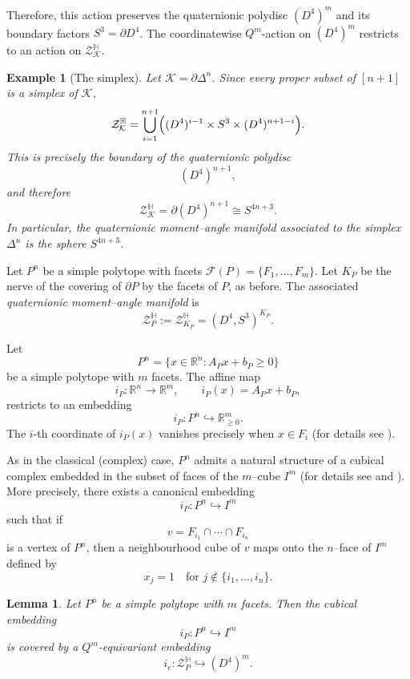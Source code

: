 \documentclass[11pt,a4paper]{article}
\numberwithin{equation}{section}
\newtheorem{example}[definition]{Example}
\newtheorem{lemma}[definition]{Lemma}
\theoremstyle{named}
\begin{document}
Therefore, this action preserves the quaternionic polydisc \((D^4)^m\) and its boundary factors \(S^3=\partial D^4\). The coordinatewise \(Q^m\)-action on \((D^4)^m\) restricts to an action on \(\mathcal Z_{\mathcal K}^{\mathbb H}\).

\begin{example}[The simplex]\label{ex:simplex}
Let \(\mathcal K=\partial\Delta^n\). Since every proper subset of \([n+1]\) is a simplex of \(\mathcal K\),
\[
\mathcal Z_{\mathcal K}^{\mathbb H}=\bigcup_{i=1}^{n+1} \Bigl( (D^4)^{i-1}\times S^3\times (D^4)^{n+1-i} \Bigr).
\]
This is precisely the boundary of the quaternionic polydisc
\[
(D^4)^{n+1},
\]
and therefore
\[
\mathcal Z_{\mathcal K}^{\mathbb H}=\partial (D^4)^{n+1} \cong S^{4n+3}.
\]
In particular, the quaternionic moment--angle manifold associated to the simplex \(\Delta^n\) is the sphere \(S^{4n+3}\).
\end{example}
\medskip

Let \(P^n\) be a simple polytope with facets \(\mathcal F(P)=\{F_1,\ldots,F_m\}\). Let \(K_P\) be the nerve of the covering of \(\partial P\) by the facets of \(P\), as before. The associated \emph{quaternionic moment--angle manifold} is
\[
    \mathcal Z_P^{\mathbb H}
    :=
    \mathcal Z_{K_P}^{\mathbb H}
    =
    (D^4,S^3)^{K_P}.
\]

Let
\[
P^n=\{x\in\mathbb R^n : A_Px+b_P\ge 0\}
\]
be a simple polytope with \(m\) facets. The affine map
\[
i_P:\mathbb R^n\longrightarrow\mathbb R^m, \qquad i_P(x)=A_Px+b_P,
\]
restricts to an embedding
\[
i_P:P^n\hookrightarrow \mathbb R_{\ge0}^m.
\]
The \(i\)-th coordinate of \(i_P(x)\) vanishes precisely when \(x\in F_i\) (for details see \cite{panov2010}). 

As in the classical (complex) case, $P^n$ admits a natural structure of a cubical complex embedded in the subset of faces of the $m$--cube $I^m$ (for details see \cite[Theorem 2.2]{bp} and \cite[pp.~77]{ho}). More precisely, there exists a canonical embedding
\[
i_P : P^n \hookrightarrow I^m
\]
such that if
\[
v = F_{i_1}\cap\cdots\cap F_{i_n}
\]
is a vertex of $P^n$, then a neighbourhood cube of $v$ maps onto the $n$–face of $I^m$ defined by
\[
x_j=1 \quad \text{for } j\notin\{i_1,\dots,i_n\}.
\]


\begin{lemma}\label{lem:embedding cover}
Let \(P^n\) be a simple polytope with \(m\) facets. Then the cubical embedding
\[
i_P:P^n\hookrightarrow I^m
\]
is covered by a \(Q^m\)-equivariant embedding
\[
i_e:\mathcal Z_P^{\mathbb H}\hookrightarrow (D^4)^m.
\]
\end{lemma}
\end{document}
